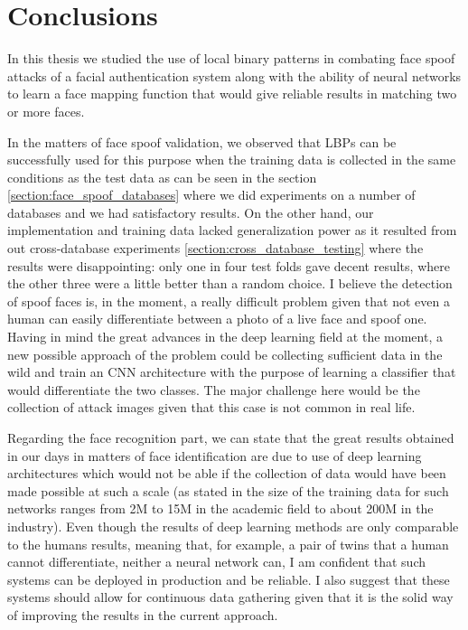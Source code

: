 \chapter{Conclusions}
In this thesis we studied the use of local binary patterns in combating face spoof attacks of a facial authentication system along with the ability of neural networks to learn a face mapping function that would give reliable results in matching two or more faces. 

In the matters of face spoof validation, we observed that LBPs can be successfully used for this purpose when the training data is collected in the same conditions as the test data as can be seen in the section \ref{section:face_spoof_databases} where we did experiments on a number of databases and we had satisfactory results. On the other hand, our implementation and training data lacked generalization power as it resulted from out cross-database experiments \ref{section:cross_database_testing} where the results were disappointing: only one in four test folds gave decent results, where the other three were a little better than a random choice. I believe the detection of spoof faces is, in the moment, a really difficult problem given that not even a human can easily differentiate between a photo of a live face and spoof one. Having in mind the great advances in the deep learning field at the moment, a new possible approach of the problem could be collecting sufficient data in the wild and train an CNN architecture with the purpose of learning a classifier that would differentiate the two classes. The major challenge here would be the collection of attack images given that this case is not common in real life.

Regarding the face recognition part, we can state that the great results obtained in our days in matters of face identification are due to use of deep learning architectures which would not be able if the collection of data would have been made possible at such a scale (as stated in \cite{LiuDBH15} the size of the training data for such networks ranges from 2M to 15M in the academic field to about 200M in the industry). Even though the results of deep learning methods are only comparable to the humans results, meaning that, for example, a pair of twins that a human cannot differentiate, neither a neural network can, I am confident that such systems can be deployed in production and be reliable. I also suggest that these systems should allow for continuous data gathering given that it is the solid way of improving the results in the current approach.

